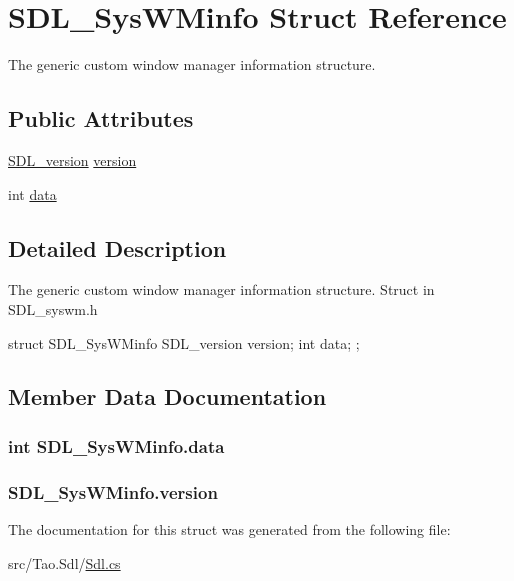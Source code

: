 \hypertarget{struct_s_d_l___sys_w_minfo}{
\section{SDL\_\-SysWMinfo Struct Reference}
\label{struct_s_d_l___sys_w_minfo}
}


The generic custom window manager information structure.  


\subsection*{Public Attributes}
\begin{DoxyCompactItemize}
\item 
\hyperlink{struct_s_d_l__version}{SDL\_\-version} \hyperlink{struct_s_d_l___sys_w_minfo_a1e77bcb33eac553648cfd46e31e9238b}{version}
\item 
int \hyperlink{struct_s_d_l___sys_w_minfo_a669456bc75b4c233a17c01fc7a8b0782}{data}
\end{DoxyCompactItemize}


\subsection{Detailed Description}
The generic custom window manager information structure. Struct in SDL\_\-syswm.h 
\begin{DoxyCode}
            struct SDL_SysWMinfo {
                SDL_version version;
                int data;
            };          
\end{DoxyCode}
  

\subsection{Member Data Documentation}
\hypertarget{struct_s_d_l___sys_w_minfo_a669456bc75b4c233a17c01fc7a8b0782}{
\subsubsection[{data}]{\setlength{\rightskip}{0pt plus 5cm}int {\bf SDL\_\-SysWMinfo.data}}}
\label{struct_s_d_l___sys_w_minfo_a669456bc75b4c233a17c01fc7a8b0782}
\hypertarget{struct_s_d_l___sys_w_minfo_a1e77bcb33eac553648cfd46e31e9238b}{
\subsubsection[{version}]{ {\bf SDL\_\-SysWMinfo.version}}}
\label{struct_s_d_l___sys_w_minfo_a1e77bcb33eac553648cfd46e31e9238b}


The documentation for this struct was generated from the following file:\begin{DoxyCompactItemize}
\item 
src/Tao.Sdl/\hyperlink{_sdl_8cs}{Sdl.cs}\end{DoxyCompactItemize}
